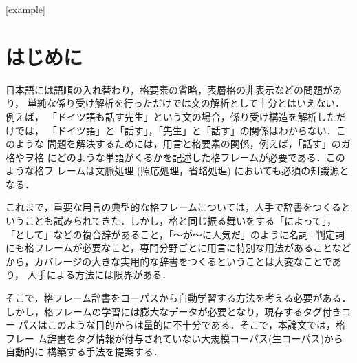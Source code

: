 
[example]
\renewcommand{\theexample}{}
\renewcommand{\thesubexample}{}
\newcommand{\ex}{}
\newcommand{\subex}{}


\newcommand{\itemex}{}
\def\exa#1{}

\newenvironment{exn}{}{}

\def\qline#1#2{}

\def\hhline{}

\renewcommand{\theequation}{}

\maketitle

\section{はじめに}
\label{はじめに}

日本語には語順の入れ替わり，格要素の省略，表層格の非表示などの問題があり，
単純な係り受け解析を行っただけでは文の解析として十分とはいえない．例えば，
「ドイツ語も話す先生」という文の場合，係り受け構造を解析しただけでは，
「ドイツ語」と「話す」，「先生」と「話す」の関係はわからない．このような
問題を解決するためには，用言と格要素の関係，例えば，「話す」のガ格やヲ格
にどのような単語がくるかを記述した格フレームが必要である．このような格フ
レームは文脈処理 (照応処理，省略処理) においても必須の知識源となる．

これまで，重要な用言の典型的な格フレームについては，人手で辞書をつくると
いうことも試みられてきた．しかし，格と同じ振る舞いをする「によって」，
「として」などの複合辞があること，「〜が〜に人気だ」のように名詞+判定詞
にも格フレームが必要なこと，専門分野ごとに用言に特別な用法があることなど
から，カバレージの大きな実用的な辞書をつくるということは大変なことであり，
人手による方法には限界がある．

そこで，格フレーム辞書をコーパスから自動学習する方法を考える必要がある．
しかし，格フレームの学習には膨大なデータが必要となり，現存するタグ付きコー
パスはこのような目的からは量的に不十分である．そこで，本論文では，格フレー
ム辞書をタグ情報が付与されていない大規模コーパス(生コーパス)から自動的に
構築する手法を提案する．

